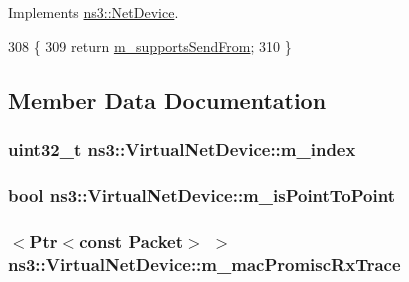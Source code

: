 Implements \hyperlink{classns3_1_1NetDevice_a04793d220b54c40e110ebf86dae5b25c}{ns3\+::\+Net\+Device}.


\begin{DoxyCode}
308 \{
309   \textcolor{keywordflow}{return} \hyperlink{classns3_1_1VirtualNetDevice_aac37389af138f3fae76a3219f9e69869}{m\_supportsSendFrom};
310 \}
\end{DoxyCode}


\subsection{Member Data Documentation}
\subsubsection[{\texorpdfstring{m\+\_\+index}{m_index}}]{\setlength{\rightskip}{0pt plus 5cm}uint32\+\_\+t ns3\+::\+Virtual\+Net\+Device\+::m\+\_\+index\hspace{0.3cm}{\ttfamily [private]}}\hypertarget{classns3_1_1VirtualNetDevice_a2f1e2e67cf29cc3fd446e2d9c410e9fc}{}\label{classns3_1_1VirtualNetDevice_a2f1e2e67cf29cc3fd446e2d9c410e9fc}
\subsubsection[{\texorpdfstring{m\+\_\+is\+Point\+To\+Point}{m_isPointToPoint}}]{\setlength{\rightskip}{0pt plus 5cm}bool ns3\+::\+Virtual\+Net\+Device\+::m\+\_\+is\+Point\+To\+Point\hspace{0.3cm}{\ttfamily [private]}}\hypertarget{classns3_1_1VirtualNetDevice_af59a3ce1a68aa62f1bded3e131440cbc}{}\label{classns3_1_1VirtualNetDevice_af59a3ce1a68aa62f1bded3e131440cbc}
\subsubsection[{\texorpdfstring{m\+\_\+mac\+Promisc\+Rx\+Trace}{m_macPromiscRxTrace}}]{$<${\bf Ptr}$<$const {\bf Packet}$>$ $>$ ns3\+::\+Virtual\+Net\+Device\+::m\+\_\+mac\+Promisc\+Rx\+Trace\hspace{0.3cm}{\ttfamily [private]}}\hypertarget{classns3_1_1VirtualNetDevice_a978beda53d5a1309d1fff0cbfb3137b6}{}\label{classns3_1_1VirtualNetDevice_a978beda53d5a1309d1fff0cbfb3137b6}

